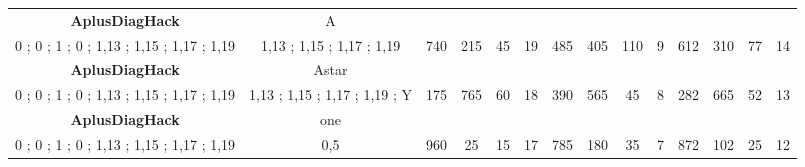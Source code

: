 \begin{table}[H]
{\begin{tabular}{|c|c|c|c|c|c|c|c|c|c|c|c|c|c|}
\cellcolor{blue!15}\textbf{AplusDiagHack} & A& {\color[HTML]{00009B} } & {\color[HTML]{9A0000} } & {\color[HTML]{009901} } &  & {\color[HTML]{00009B} } & {\color[HTML]{9A0000} } & {\color[HTML]{009901} } &  & {\color[HTML]{00009B} } & {\color[HTML]{9A0000} } & {\color[HTML]{009901} } &  \\ 
\cellcolor{ blue!15}0 ; 0 ; 1 ; 0 ; 1,13 ; 1,15 ; 1,17 ; 1,19 & 1,13 ; 1,15 ; 1,17 ; 1,19 & \multirow{-2}{*}{{\color[HTML]{00009B} 740}} & \multirow{-2}{*}{{\color[HTML]{9A0000} 215}} & \multirow{-2}{*}{{\color[HTML]{009901} 45}} & \multirow{-2}{*}{19} & \multirow{-2}{*}{{\color[HTML]{00009B} 485}} & \multirow{-2}{*}{{\color[HTML]{9A0000} 405}} & \multirow{-2}{*}{{\color[HTML]{009901} 110}} & \multirow{-2}{*}{9} & \multirow{-2}{*}{{\color[HTML]{00009B} 612}} & \multirow{-2}{*}{{\color[HTML]{9A0000} 310}} & \multirow{-2}{*}{{\color[HTML]{009901} 77}} & \multirow{-2}{*}{14} \\ \hline

\cellcolor{blue!15}\textbf{AplusDiagHack} & Astar& {\color[HTML]{00009B} } & {\color[HTML]{9A0000} } & {\color[HTML]{009901} } &  & {\color[HTML]{00009B} } & {\color[HTML]{9A0000} } & {\color[HTML]{009901} } &  & {\color[HTML]{00009B} } & {\color[HTML]{9A0000} } & {\color[HTML]{009901} } &  \\ 
\cellcolor{ blue!15}0 ; 0 ; 1 ; 0 ; 1,13 ; 1,15 ; 1,17 ; 1,19 & 1,13 ; 1,15 ; 1,17 ; 1,19 ; Y & \multirow{-2}{*}{{\color[HTML]{00009B} 175}} & \multirow{-2}{*}{{\color[HTML]{9A0000} 765}} & \multirow{-2}{*}{{\color[HTML]{009901} 60}} & \multirow{-2}{*}{18} & \multirow{-2}{*}{{\color[HTML]{00009B} 390}} & \multirow{-2}{*}{{\color[HTML]{9A0000} 565}} & \multirow{-2}{*}{{\color[HTML]{009901} 45}} & \multirow{-2}{*}{8} & \multirow{-2}{*}{{\color[HTML]{00009B} 282}} & \multirow{-2}{*}{{\color[HTML]{9A0000} 665}} & \multirow{-2}{*}{{\color[HTML]{009901} 52}} & \multirow{-2}{*}{13} \\ \hline

\cellcolor{blue!15}\textbf{AplusDiagHack} & one& {\color[HTML]{00009B} } & {\color[HTML]{9A0000} } & {\color[HTML]{009901} } &  & {\color[HTML]{00009B} } & {\color[HTML]{9A0000} } & {\color[HTML]{009901} } &  & {\color[HTML]{00009B} } & {\color[HTML]{9A0000} } & {\color[HTML]{009901} } &  \\ 
\cellcolor{ blue!15}0 ; 0 ; 1 ; 0 ; 1,13 ; 1,15 ; 1,17 ; 1,19 & 0,5 & \multirow{-2}{*}{{\color[HTML]{00009B} 960}} & \multirow{-2}{*}{{\color[HTML]{9A0000} 25}} & \multirow{-2}{*}{{\color[HTML]{009901} 15}} & \multirow{-2}{*}{17} & \multirow{-2}{*}{{\color[HTML]{00009B} 785}} & \multirow{-2}{*}{{\color[HTML]{9A0000} 180}} & \multirow{-2}{*}{{\color[HTML]{009901} 35}} & \multirow{-2}{*}{7} & \multirow{-2}{*}{{\color[HTML]{00009B} 872}} & \multirow{-2}{*}{{\color[HTML]{9A0000} 102}} & \multirow{-2}{*}{{\color[HTML]{009901} 25}} & \multirow{-2}{*}{12} \\ \hline


\end{tabular}}
\end{table}
